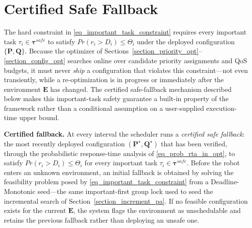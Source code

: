 	\section{Certified Safe Fallback}
	\label{section_safety_fallback}


    The hard constraint in \eqref{eq_important_task_constraint} requires every important task $\tau_i \in \boldsymbol{\tau}^{safe}$ to satisfy $Pr(r_i > D_i) \leq \Theta_i$ under the deployed configuration $\{\boldsymbol{P}, \boldsymbol{Q}\}$.
    Because the optimizer of Sections~\ref{section_priority_opt}--\ref{section_config_opt} searches online over candidate priority assignments and QoS budgets, it must never \emph{ship} a configuration that violates this constraint---not even transiently, while a re-optimization is in progress or immediately after the environment $\textbf{E}$ has changed.
    The certified safe-fallback mechanism described below makes this important-task safety guarantee a built-in property of the framework rather than a conditional assumption on a user-supplied execution-time upper bound.

    \textbf{Certified fallback.}
    At every interval the scheduler runs a \emph{certified safe fallback}: the most recently deployed configuration $(\boldsymbol{P}^{\star},\boldsymbol{Q}^{\star})$ that has been verified, through the probabilistic response-time analysis of \eqref{eq_prob_rta_in_opt}, to satisfy $Pr(r_i > D_i) \leq \Theta_i$ for every important task $\tau_i \in \boldsymbol{\tau}^{safe}$.
    Before the robot enters an unknown environment, an initial fallback is obtained by solving the feasibility problem posed by \eqref{eq_important_task_constraint} from a Deadline-Monotonic seed---the same important-first group lock used to seed the incremental search of Section~\ref{section_increment_pa}.
    If no feasible configuration exists for the current $\textbf{E}$, the system flags the environment as unschedulable and retains the previous fallback rather than deploying an unsafe one.

